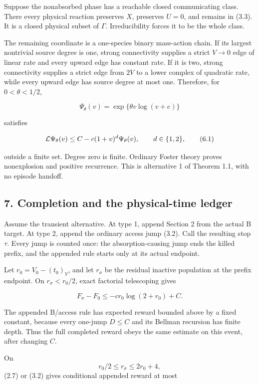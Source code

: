 Suppose the nonabsorbed phase has a reachable closed communicating
class. There every physical reaction preserves \(X\), preserves \(U=0\),
and remains in (3.3). It is a closed physical subset of \(\Gamma\).
Irreducibility forces it to be the whole class.

The remaining coordinate is a one-species binary mass-action chain. If
its largest nontrivial source degree is one, strong connectivity
supplies a strict \(V\to0\) edge of linear rate and every upward edge
has constant rate. If it is two, strong connectivity supplies a strict
edge from \(2V\) to a lower complex of quadratic rate, while every
upward edge has source degree at most one. Therefore, for
\(0<\theta<1/2\),

\[
 \Psi_\theta(v)=\exp\{\theta v\log(v+e)\}
\]

satisfies

\[
        {\cal L}\Psi_\theta(v)
          \le C-c(1+v)^d\Psi_\theta(v),
          \qquad d\in\{1,2\},                       \tag{6.1}
\]

outside a finite set. Degree zero is finite. Ordinary Foster theory
proves nonexplosion and positive recurrence. This is alternative 1 of
Theorem 1.1, with no episode handoff.

\subsection{7. Completion and the physical-time
ledger}

Assume the transient alternative. At type 1, append Section 2 from the
actual B target. At type 2, append the ordinary access jump (3.2). Call
the resulting stop \(\tau\). Every jump is counted once: the
absorption-causing jump ends the killed prefix, and the appended rule
starts only at its actual endpoint.

Let \(r_0=V_0-(t_0)_V\), and let \(r_\sigma\) be the residual inactive
population at the prefix endpoint. On \(r_\sigma<r_0/2\), exact
factorial telescoping gives

\[
 F_\sigma-F_0\le-c r_0\log(2+r_0)+C.                \tag{7.1}
\]

The appended B/access rule has expected reward bounded above by a fixed
constant, because every one-jump \(D\le C\) and its Bellman recursion
has finite depth. Thus the full completed reward obeys the same estimate
on this event, after changing \(C\).

On \[
             r_0/2\le r_\sigma\le2r_0+4,             \tag{7.2a}
\] (2.7) or (3.2) gives conditional appended reward at most

